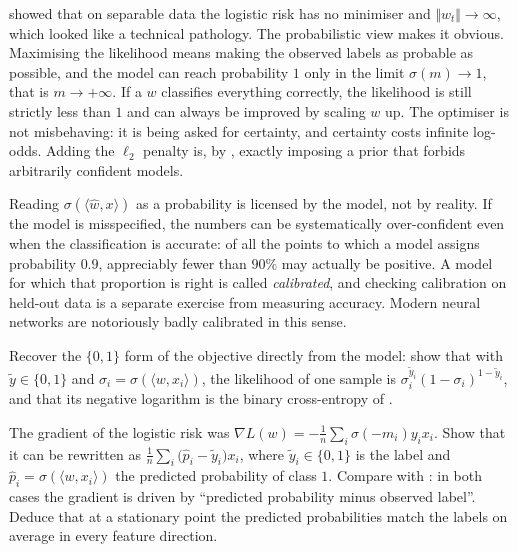 \begin{remark}
 showed that on separable data the logistic risk has no
minimiser and $\Vert w_t \Vert \to \infty$, which looked like a technical pathology. The
probabilistic view makes it obvious. Maximising the likelihood means making the
observed labels as probable as possible, and the model can reach probability $1$ only in
the limit $\sigma(m) \to 1$, that is $m \to +\infty$. If a $w$ classifies everything
correctly, the likelihood is still strictly less than $1$ and can always be improved by
scaling $w$ up. The optimiser is not misbehaving: it is being asked for certainty, and
certainty costs infinite log-odds. Adding the $\ell_2$ penalty is, by
, exactly imposing a prior that forbids arbitrarily confident models.
\end{remark}

\begin{remark}
Reading $\sigma(\langle \hat w, x\rangle)$ as a probability is licensed by the model,
not by reality. If the model is misspecified, the numbers can be systematically
over-confident even when the classification is accurate: of all the points to which a
model assigns probability $0.9$, appreciably fewer than $90\%$ may actually be positive.
A model for which that proportion is right is called \emph{calibrated}, and checking
calibration on held-out data is a separate exercise from measuring accuracy. Modern
neural networks are notoriously badly calibrated in this sense.
\end{remark}

\begin{exercise}[$\star$]
Recover the $\{0,1\}$ form of the objective directly from the model: show that with
$\tilde y \in \{0,1\}$ and $\sigma_i = \sigma(\langle w, x_i\rangle)$, the likelihood of
one sample is $\sigma_i^{\tilde y_i} (1 - \sigma_i)^{1 - \tilde y_i}$, and that its
negative logarithm is the binary cross-entropy of .
\end{exercise}

\begin{exercise}[$\star\star$]
The gradient of the logistic risk was $\nabla L(w) = -\tfrac1n\sum_i \sigma(-m_i) y_i
x_i$. Show that it can be rewritten as $\tfrac1n \sum_i \big( \hat p_i - \tilde y_i
\big) x_i$, where $\tilde y_i \in \{0,1\}$ is the label and $\hat p_i = \sigma(\langle
w, x_i\rangle)$ the predicted probability of class $1$. Compare with
: in both cases the gradient is driven by ``predicted
probability minus observed label''. Deduce that at a stationary point the predicted
probabilities match the labels on average in every feature direction.
\end{exercise}



